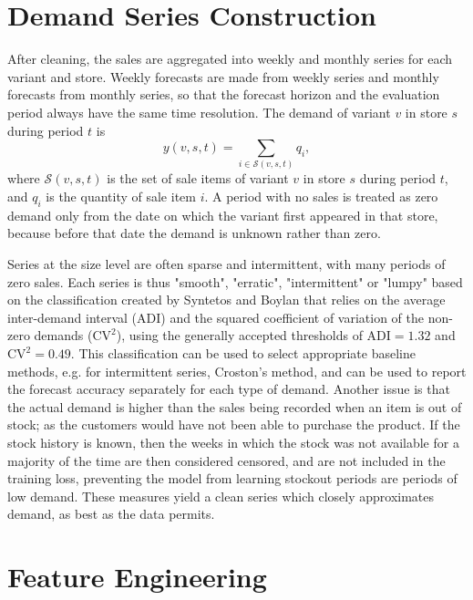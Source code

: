 \documentclass{StockSense}
\begin{document}
\section{Demand Series Construction}
\label{sec:series}

After cleaning, the sales are aggregated into weekly and monthly series for each variant and store. Weekly forecasts are made from weekly series and monthly forecasts from monthly series, so that the forecast horizon and the evaluation period always have the same time resolution. The demand of variant $v$ in store $s$ during period $t$ is
\begin{equation}
    y(v,s,t) = \sum_{i \in \mathcal{S}(v,s,t)} q_i,
\end{equation}
where $\mathcal{S}(v,s,t)$ is the set of sale items of variant $v$ in store $s$ during period $t$, and $q_i$ is the quantity of sale item $i$. A period with no sales is treated as zero demand only from the date on which the variant first appeared in that store, because before that date the demand is unknown rather than zero.

Series at the size level are often sparse and intermittent, with many periods of zero sales. Each series is thus "smooth", "erratic", "intermittent" or "lumpy" based on the classification created by Syntetos and Boylan that relies on the average inter-demand interval (ADI) and the squared coefficient of variation of the non-zero demands ($\mathrm{CV}^2$), using the generally accepted thresholds of $\mathrm{ADI}=1.32$ and $\mathrm{CV}^2=0.49$. This classification can be used to select appropriate baseline methods, e.g. for intermittent series, Croston's method, and can be used to report the forecast accuracy separately for each type of demand. Another issue is that the actual demand is higher than the sales being recorded when an item is out of stock; as the customers would have not been able to purchase the product. If the stock history is known, then the weeks in which the stock was not available for a majority of the time are then considered censored, and are not included in the training loss, preventing the model from learning stockout periods are periods of low demand. These measures yield a clean series which closely approximates demand, as best as the data permits.

\section{Feature Engineering}
\label{sec:features}
\end{document}
